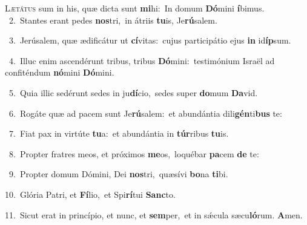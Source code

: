 \lettrine{\initial\textcolor{\initialcolor}{L}}{ætátus} sum in his, quæ dicta sunt \textbf{mi}\-hi:~\star In domum \textbf{Dó}\-mini \textbf{í}\-bimus.\\
{\numbfont\textcolor{\numbcolor}{~2.}}~Stantes erant pedes \textbf{nos}\-tri,~\star in átriis \textbf{tu}\-is, Je\-\textbf{rú}\-salem.\par
{\numbfont\textcolor{\numbcolor}{~3.}}~Jerúsalem, quæ ædificátur ut \textbf{cí}\-vitas:~\star cujus participátio ejus \textbf{in} id\-\textbf{íp}\-sum.\par
{\numbfont\textcolor{\numbcolor}{~4.}}~Illuc enim ascendérunt tribus, tribus \textbf{Dó}\-mini:~\star testimónium Israël ad confiténdum \textbf{nó}\-mini \textbf{Dó}\-mini.\par
{\numbfont\textcolor{\numbcolor}{~5.}}~Quia illic sedérunt sedes in ju\-\textbf{dí}\-cio,~\star sedes super \textbf{do}\-mum \textbf{Da}\-vid.\par
{\numbfont\textcolor{\numbcolor}{~6.}}~Rogáte quæ ad pacem sunt Je\-\textbf{rú}\-salem:~\star et abundántia dili\-\textbf{gén}\-ti\textbf{bus} te:\par
{\numbfont\textcolor{\numbcolor}{~7.}}~Fiat pax in virtúte \textbf{tu}\-a:~\star et abundántia in \textbf{túr}\-ribus \textbf{tu}\-is.\par
{\numbfont\textcolor{\numbcolor}{~8.}}~Propter fratres meos, et próximos \textbf{me}\-os,~\star loquébar \textbf{pa}\-cem \textbf{de} te:\par
{\numbfont\textcolor{\numbcolor}{~9.}}~Propter domum Dómini, Dei \textbf{nos}\-tri,~\star quæsívi \textbf{bo}\-na \textbf{ti}\-bi.\par
{\numbfont\textcolor{\numbcolor}{10.}}~Glória Patri, et \textbf{Fí}\-lio,~\star et Spi\-\textbf{rí}\-tui \textbf{Sanc}\-to.\par
{\numbfont\textcolor{\numbcolor}{11.}}~Sicut erat in princípio, et nunc, et \textbf{sem}\-per,~\star et in sǽcula sæcu\-\textbf{ló}\-rum. \textbf{A}\-men.\par
